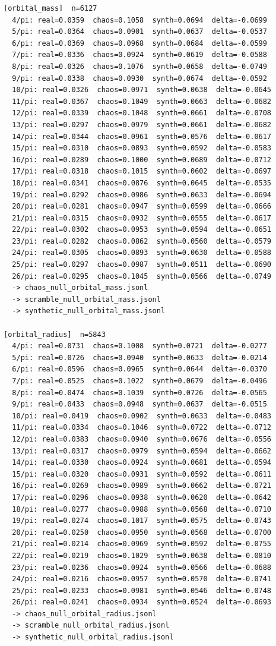 \documentclass[11pt, letterpaper, openany]{book}
\begin{document}
\begin{empiricalbox}
\begin{lstlisting}[style=terminal]
[orbital_mass]  n=6127
  4/pi: real=0.0359  chaos=0.1058  synth=0.0694  delta=-0.0699
  5/pi: real=0.0364  chaos=0.0901  synth=0.0637  delta=-0.0537
  6/pi: real=0.0369  chaos=0.0968  synth=0.0684  delta=-0.0599
  7/pi: real=0.0336  chaos=0.0924  synth=0.0619  delta=-0.0588
  8/pi: real=0.0326  chaos=0.1076  synth=0.0658  delta=-0.0749
  9/pi: real=0.0338  chaos=0.0930  synth=0.0674  delta=-0.0592
  10/pi: real=0.0326  chaos=0.0971  synth=0.0638  delta=-0.0645
  11/pi: real=0.0367  chaos=0.1049  synth=0.0663  delta=-0.0682
  12/pi: real=0.0339  chaos=0.1048  synth=0.0661  delta=-0.0708
  13/pi: real=0.0297  chaos=0.0979  synth=0.0661  delta=-0.0682
  14/pi: real=0.0344  chaos=0.0961  synth=0.0576  delta=-0.0617
  15/pi: real=0.0310  chaos=0.0893  synth=0.0592  delta=-0.0583
  16/pi: real=0.0289  chaos=0.1000  synth=0.0689  delta=-0.0712
  17/pi: real=0.0318  chaos=0.1015  synth=0.0602  delta=-0.0697
  18/pi: real=0.0341  chaos=0.0876  synth=0.0645  delta=-0.0535
  19/pi: real=0.0292  chaos=0.0986  synth=0.0633  delta=-0.0694
  20/pi: real=0.0281  chaos=0.0947  synth=0.0599  delta=-0.0666
  21/pi: real=0.0315  chaos=0.0932  synth=0.0555  delta=-0.0617
  22/pi: real=0.0302  chaos=0.0953  synth=0.0594  delta=-0.0651
  23/pi: real=0.0282  chaos=0.0862  synth=0.0560  delta=-0.0579
  24/pi: real=0.0305  chaos=0.0893  synth=0.0630  delta=-0.0588
  25/pi: real=0.0297  chaos=0.0987  synth=0.0511  delta=-0.0690
  26/pi: real=0.0295  chaos=0.1045  synth=0.0566  delta=-0.0749
  -> chaos_null_orbital_mass.jsonl
  -> scramble_null_orbital_mass.jsonl
  -> synthetic_null_orbital_mass.jsonl

[orbital_radius]  n=5843
  4/pi: real=0.0731  chaos=0.1008  synth=0.0721  delta=-0.0277
  5/pi: real=0.0726  chaos=0.0940  synth=0.0633  delta=-0.0214
  6/pi: real=0.0596  chaos=0.0965  synth=0.0644  delta=-0.0370
  7/pi: real=0.0525  chaos=0.1022  synth=0.0679  delta=-0.0496
  8/pi: real=0.0474  chaos=0.1039  synth=0.0726  delta=-0.0565
  9/pi: real=0.0433  chaos=0.0948  synth=0.0637  delta=-0.0515
  10/pi: real=0.0419  chaos=0.0902  synth=0.0633  delta=-0.0483
  11/pi: real=0.0334  chaos=0.1046  synth=0.0722  delta=-0.0712
  12/pi: real=0.0383  chaos=0.0940  synth=0.0676  delta=-0.0556
  13/pi: real=0.0317  chaos=0.0979  synth=0.0594  delta=-0.0662
  14/pi: real=0.0330  chaos=0.0924  synth=0.0681  delta=-0.0594
  15/pi: real=0.0320  chaos=0.0931  synth=0.0592  delta=-0.0611
  16/pi: real=0.0269  chaos=0.0989  synth=0.0662  delta=-0.0721
  17/pi: real=0.0296  chaos=0.0938  synth=0.0620  delta=-0.0642
  18/pi: real=0.0277  chaos=0.0988  synth=0.0568  delta=-0.0710
  19/pi: real=0.0274  chaos=0.1017  synth=0.0575  delta=-0.0743
  20/pi: real=0.0250  chaos=0.0950  synth=0.0568  delta=-0.0700
  21/pi: real=0.0214  chaos=0.0969  synth=0.0592  delta=-0.0755
  22/pi: real=0.0219  chaos=0.1029  synth=0.0638  delta=-0.0810
  23/pi: real=0.0236  chaos=0.0924  synth=0.0566  delta=-0.0688
  24/pi: real=0.0216  chaos=0.0957  synth=0.0570  delta=-0.0741
  25/pi: real=0.0233  chaos=0.0981  synth=0.0546  delta=-0.0748
  26/pi: real=0.0241  chaos=0.0934  synth=0.0524  delta=-0.0693
  -> chaos_null_orbital_radius.jsonl
  -> scramble_null_orbital_radius.jsonl
  -> synthetic_null_orbital_radius.jsonl


\end{lstlisting}
\end{empiricalbox}
\end{document}
